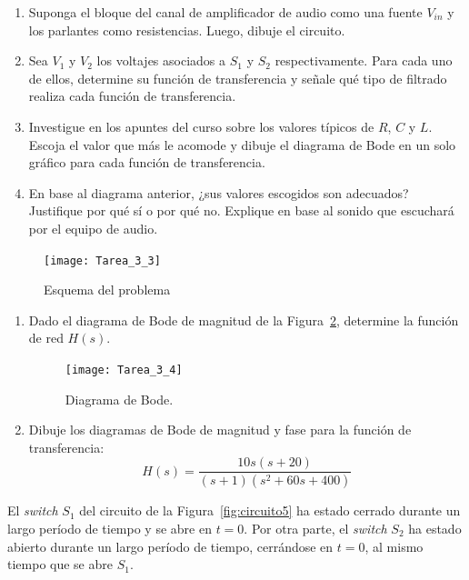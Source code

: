 \documentclass[
  11pt,
  letterpaper,
   addpoints,
  ]{exam}
\begin{document}
\begin{questions}
\begin{enumerate}
    \item Suponga el bloque del canal de amplificador de audio como una fuente $V_{in}$ y los parlantes como resistencias. Luego, dibuje el circuito.
    
    \item Sea $V_1$ y $V_2$ los voltajes asociados a $S_1$ y $S_2$ respectivamente. Para cada uno de ellos, determine su función de transferencia y señale qué tipo de filtrado realiza cada función de transferencia.
    
    \item Investigue en los apuntes del curso sobre los valores típicos de $R$, $C$ y $L$. Escoja el valor que más le acomode y dibuje el diagrama de Bode en un solo gráfico para cada función de transferencia.
    
    \item En base al diagrama anterior, ¿sus valores escogidos son adecuados? Justifique por qué sí o por qué no. Explique en base al sonido que escuchará por el equipo de audio.
\end{enumerate}

\begin{figure}[h!]
    \centering
    \texttt{[image: Tarea\_3\_3]}
    \caption{Esquema del problema}
    \label{fig:tarea3-3}
\end{figure}
\newpage

\question   
 \begin{enumerate}
    \item Dado el diagrama de Bode de magnitud de la Figura~\ref{fig:bode}, determine la función de red $H(s)$.

    \begin{figure}[h!]
        \centering
        \texttt{[image: Tarea\_3\_4]}
        \caption{Diagrama de Bode.}
        \label{fig:bode}
    \end{figure}

    \item Dibuje los diagramas de Bode de magnitud y fase para la función de transferencia:
    \begin{equation}
        H(s) = \frac{10s(s + 20)}{(s + 1)(s^2 + 60s + 400)}
        \label{eq:bode-func}
    \end{equation}
\end{enumerate}

\question El \textit{switch} $S_1$ del circuito de la Figura~\ref{fig:circuito5} ha estado cerrado durante un largo período de tiempo y se abre en $t = 0$. Por otra parte, el \textit{switch} $S_2$ ha estado abierto durante un largo período de tiempo, cerrándose en $t = 0$, al mismo tiempo que se abre $S_1$.


\end{questions}
\end{document}
